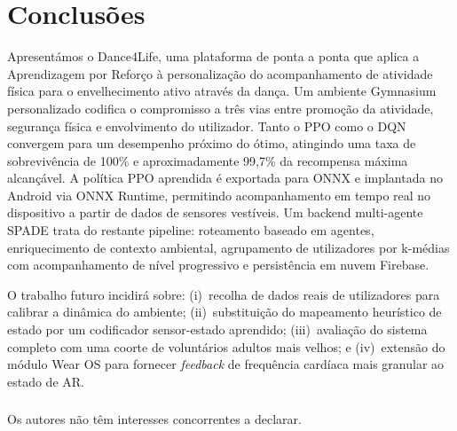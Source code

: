 \documentclass[runningheads]{llncs}
\begin{document}
%
\section{Conclusões}
\label{sec:conclusions}

Apresentámos o Dance4Life, uma plataforma de ponta a ponta que aplica a
Aprendizagem por Reforço à personalização do acompanhamento de atividade física
para o envelhecimento ativo através da dança. Um ambiente Gymnasium personalizado
codifica o compromisso a três vias entre promoção da atividade, segurança física
e envolvimento do utilizador. Tanto o PPO como o DQN convergem para um desempenho
próximo do ótimo, atingindo uma taxa de sobrevivência de 100\% e aproximadamente
99,7\% da recompensa máxima alcançável. A política PPO aprendida é exportada para
ONNX e implantada no Android via ONNX Runtime, permitindo acompanhamento em tempo
real no dispositivo a partir de dados de sensores vestíveis. Um backend multi-agente
SPADE trata do restante pipeline: roteamento baseado em agentes, enriquecimento de
contexto ambiental, agrupamento de utilizadores por k-médias com acompanhamento de
nível progressivo e persistência em nuvem Firebase.

O trabalho futuro incidirá sobre: (i)~recolha de dados reais de utilizadores para
calibrar a dinâmica do ambiente; (ii)~substituição do mapeamento heurístico de
estado por um codificador sensor-estado aprendido; (iii)~avaliação do sistema
completo com uma coorte de voluntários adultos mais velhos; e (iv)~extensão do
módulo Wear OS para fornecer \emph{feedback} de frequência cardíaca mais granular
ao estado de AR.

%
\begin{credits}
\subsubsection{\discintname}
Os autores não têm interesses concorrentes a declarar.
\end{credits}
\end{document}
